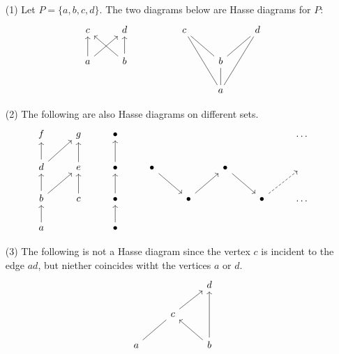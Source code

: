 \begin{example}\label{example_1.7}
  \begin{enumerate}
    \item[(1)] Let $P=\{a,b,c,d\}$. The two diagrams below are Hasse
      diagrams for $P$:
      \[\begin{tikzcd}
        c & d && c && d \\
        a & b &&& b \\
          &&&& a
          \arrow[from=2-1, to=1-1]
          \arrow[from=2-1, to=1-2]
          \arrow[from=2-2, to=1-1]
          \arrow[from=2-2, to=1-2]
          \arrow[no head, from=2-5, to=1-4]
          \arrow[no head, from=2-5, to=1-6]
          \arrow[no head, from=3-5, to=1-4]
          \arrow[no head, from=3-5, to=1-6]
          \arrow[no head, from=3-5, to=2-5]
      \end{tikzcd}\]

    \item[(2)] The following are also Hasse diagrams on different sets.
      \[\begin{tikzcd}
        f & g & \bullet &&&&& \dots \\
        d & e & \bullet & \bullet && \bullet && {} \\
        b & c & \bullet && \bullet && \bullet & \dots \\
        a && \bullet
        \arrow[from=2-1, to=1-1]
        \arrow[from=2-1, to=1-2]
        \arrow[from=2-2, to=1-2]
        \arrow[from=2-3, to=1-3]
        \arrow[from=2-4, to=3-5]
        \arrow[from=2-6, to=3-7]
        \arrow[from=3-1, to=2-1]
        \arrow[from=3-1, to=2-2]
        \arrow[from=3-2, to=2-2]
        \arrow[from=3-3, to=2-3]
        \arrow[from=3-5, to=2-6]
        \arrow[dashed, from=3-7, to=2-8]
        \arrow[from=4-1, to=3-1]
        \arrow[from=4-3, to=3-3]
      \end{tikzcd}\]

    \item[(3)] The following is not a Hasse diagram since the vertex
      $c$ is incident to the edge $ad$, but niether coincides witht
      the vertices $a$ or $d$.
      \[\begin{tikzcd}
          && d \\
          & c \\
        a && b
        \arrow[from=2-2, to=1-3]
        \arrow[no head, from=3-1, to=2-2]
        \arrow[from=3-3, to=1-3]
        \arrow[from=3-3, to=2-2]
      \end{tikzcd}\]


\end{enumerate}
\end{example}
